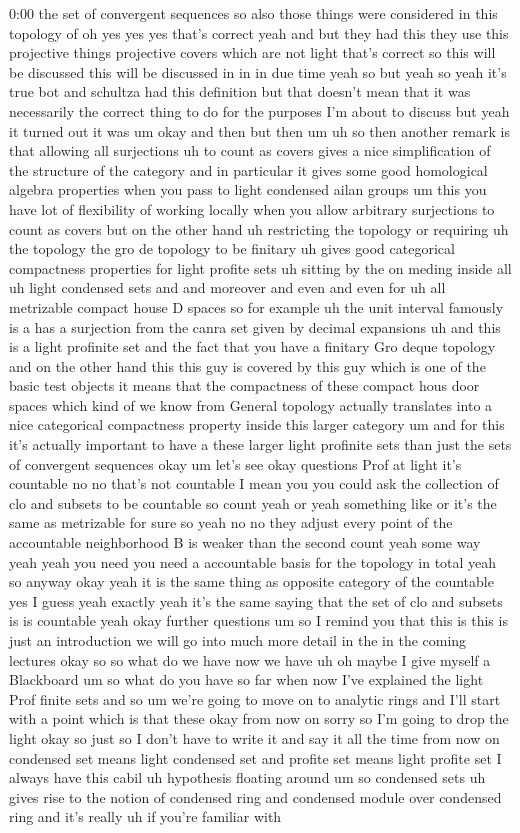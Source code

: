 \begin{unfinished}{0:00}
the set of convergent sequences so also those things were considered in this topology of oh yes yes yes that's correct yeah and but they had this they use this projective things projective covers which are not light that's correct so this will be discussed this will be discussed in in in due time yeah so but yeah so yeah it's true bot and schultza had this definition but that doesn't mean that it was necessarily the correct thing to do for the purposes I'm about to discuss but yeah it turned out it was um okay and then but then um uh so then another remark is that allowing all surjections uh to count as covers gives a nice simplification of the structure of the category and in particular it gives some good homological algebra properties when you pass to light condensed ailan groups um this you have lot of flexibility of working locally when you allow arbitrary surjections to count as covers but on the other hand uh restricting the topology or requiring uh the topology the gro de topology to be finitary uh gives good categorical compactness properties for light profite sets uh sitting by the on meding inside all uh light condensed sets and and moreover and even and even for uh all metrizable compact house D spaces so for example uh the unit interval famously is a has a surjection from the canra set given by decimal expansions uh and this is a light profinite set and the fact that you have a finitary Gro deque topology and on the other hand this this guy is covered by this guy which is one of the basic test objects it means that the compactness of these compact hous door spaces which kind of we know from General topology actually translates into a nice categorical compactness property inside this larger category um and for this it's actually important to have a these larger light profinite sets than just the sets of convergent sequences okay um let's see okay questions Prof at light it's countable no no that's not countable I mean you you could ask the collection of clo and subsets to be countable so count yeah or yeah something like or it's the same as metrizable for sure so yeah no no they adjust every point of the accountable neighborhood B is weaker than the second count yeah some way yeah yeah you need you need a accountable basis for the topology in total yeah so anyway okay yeah it is the same thing as opposite category of the countable yes I guess yeah exactly yeah it's the same saying that the set of clo and subsets is is countable yeah okay further questions um so I remind you that this is this is just an introduction we will go into much more detail in the in the coming lectures okay so so what do we have now we have uh oh maybe I give myself a Blackboard um so what do you have so far when now I've explained the light Prof finite sets and so um we're going to move on to analytic rings and I'll start with a point which is that these okay from now on sorry so I'm going to drop the light okay so just so I don't have to write it and say it all the time from now on condensed set means light condensed set and profite set means light profite set I always have this cabil uh hypothesis floating around um so condensed sets uh gives rise to the notion of condensed ring and condensed module over condensed ring and it's really uh if you're familiar with 
\end{unfinished}
